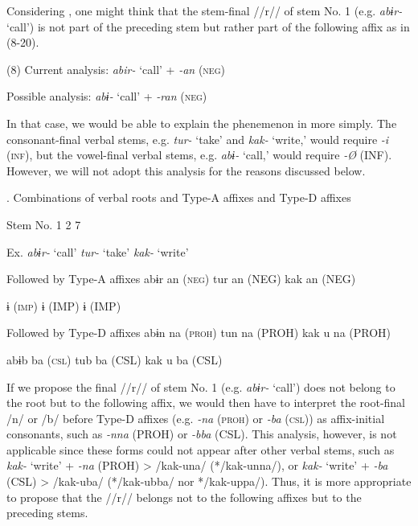 Considering , one might think that the stem-final //r// of stem No. 1 (e.g. \textit{abɨr-} ‘call’) is not part of the preceding stem but rather part of the following affix as in (8-20).

(8)  Current analysis:  \textit{abir-}  ‘call’  +  \textit{{}-an}  (\textsc{neg})

  Possible analysis:  \textit{abɨ-}  ‘call’  +  \textit{{}-ran}  (\textsc{neg})

In that case, we would be able to explain the phenemenon in  more simply. The consonant-final verbal stems, e.g. \textit{tur-} ‘take’ and \textit{kak-} ‘write,’ would require \textit{{}-i} (\textsc{inf}), but the vowel-final verbal stems, e.g. \textit{abɨ-} ‘call,’ would require \textit{{}-Ø} (INF). However, we will not adopt this analysis for the reasons discussed below.

\begin{styleBeschriftung}
\textmd{. Combinations of verbal roots and Type-A affixes and Type-D affixes}
\end{styleBeschriftung}

Stem No.  1    2    7

Ex.  \textit{abɨr-} ‘call’    \textit{tur-} ‘take’    \textit{kak-} ‘write’

Followed by Type-A affixes  abɨr    an (\textsc{neg})    tur    an (NEG)    kak    an (NEG)

      ɨ (\textsc{imp})        ɨ (IMP)        ɨ (IMP)

Followed by Type-D affixes  abɨn    na (\textsc{proh})    tun    na (PROH)    kak  u  na (PROH)

  abɨb    ba (\textsc{csl})    tub    ba (CSL)    kak  u  ba (CSL)

If we propose the final //r// of stem No. 1 (e.g. \textit{abɨr-} ‘call’) does not belong to the root but to the following affix, we would then have to interpret the root-final /n/ or /b/ before Type-D affixes (e.g. \textit{{}-na} (\textsc{proh}) or \textit{{}-ba} (\textsc{csl})) as affix-initial consonants, such as \textit{{}-nna} (PROH) or \textit{{}-bba} (CSL). This analysis, however, is not applicable since these forms could not appear after other verbal stems, such as \textit{kak-} ‘write’ + \textit{{}-na} (PROH) > /kak-una/ (*/kak-unna/), or \textit{kak-} ‘write’ + \textit{{}-ba} (CSL) > /kak-uba/ (*/kak-ubba/ nor */kak-uppa/). Thus, it is more appropriate to propose that the //r// belongs not to the following affixes but to the preceding stems.

